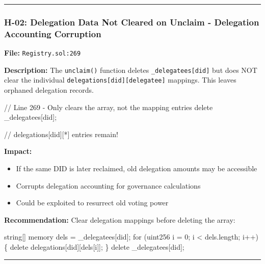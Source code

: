 \documentclass[
]{article}
\newenvironment{Shaded}{}{}
\newcommand{\NormalTok}[1]{#1}
\providecommand{\tightlist}{%
  \setlength{\itemsep}{0pt}\setlength{\parskip}{0pt}}
\begin{document}
\begin{center}\rule{0.5\linewidth}{0.5pt}\end{center}

\subsubsection{H-02: Delegation Data Not Cleared on Unclaim - Delegation
Accounting
Corruption}\label{h-02-delegation-data-not-cleared-on-unclaim---delegation-accounting-corruption}

\textbf{File:} \texttt{Registry.sol:269}

\textbf{Description:} The \texttt{unclaim()} function deletes
\texttt{\_delegatees{[}did{]}} but does NOT clear the individual
\texttt{delegations{[}did{]}{[}delegatee{]}} mappings. This leaves
orphaned delegation records.

\begin{Shaded}
\begin{Highlighting}[]
\NormalTok{// Line 269 {-} Only clears the array, not the mapping entries}
\NormalTok{delete \_delegatees[did];}

\NormalTok{// delegations[did][*] entries remain!}
\end{Highlighting}
\end{Shaded}

\textbf{Impact:}

\begin{itemize}
\tightlist
\item
  If the same DID is later reclaimed, old delegation amounts may be
  accessible
\item
  Corrupts delegation accounting for governance calculations
\item
  Could be exploited to resurrect old voting power
\end{itemize}

\textbf{Recommendation:} Clear delegation mappings before deleting the
array:

\begin{Shaded}
\begin{Highlighting}[]
\NormalTok{string[] memory dels = \_delegatees[did];}
\NormalTok{for (uint256 i = 0; i \textless{} dels.length; i++) \{}
\NormalTok{    delete delegations[did][dels[i]];}
\NormalTok{\}}
\NormalTok{delete \_delegatees[did];}
\end{Highlighting}
\end{Shaded}

\begin{center}\rule{0.5\linewidth}{0.5pt}\end{center}
\end{document}

